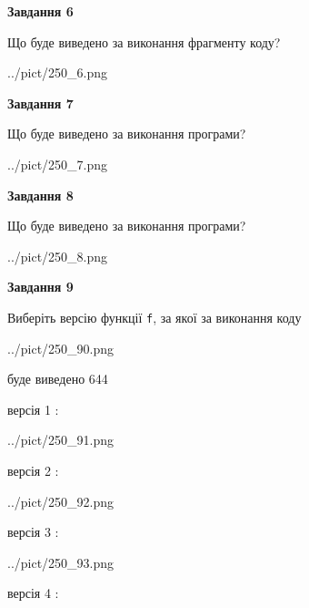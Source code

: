 \documentclass[12pt, ukrainian]{article}
\def\code#1{\Verb!#1!}
\begin{document}
{\begin {large}
{\begin {center}\textbf{Завдання 6}\end {center}}

Що буде виведено за виконання фрагменту коду?\par
\begin{center}
	{../pict/250_6.png}
\end{center}
\newpage

{\begin {center}\textbf{Завдання 7}\end {center}}

Що буде виведено за виконання програми?\par
\begin{center}
	{../pict/250_7.png}
\end{center}
\newpage

{\begin {center}\textbf{Завдання 8}\end {center}}

Що буде виведено за виконання програми?\par
\begin{center}
	{../pict/250_8.png}
\end{center}
\newpage

{\begin {center}\textbf{Завдання 9}\end {center}}

Виберіть версію функції \code{f}, за якої за виконання коду
\begin{center}
	{../pict/250_90.png}
\end{center}
буде виведено 644

\vspace{5mm}
версія 1 :

\begin{center}
	{../pict/250_91.png}
\end{center}
версія 2 :

\begin{center}
	{../pict/250_92.png}
\end{center}
версія 3 :

\begin{center}
	{../pict/250_93.png}
\end{center}
версія 4 :


\end{large}}
\end{document}
